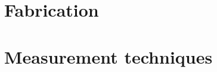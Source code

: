 \documentclass[../Matt_Gebert_Honours_Thesis.tex]{subfiles}
\begin{document}
	

	\section{Fabrication}
	
	
	
	
	\section{Measurement techniques}
	
	
\end{document}

